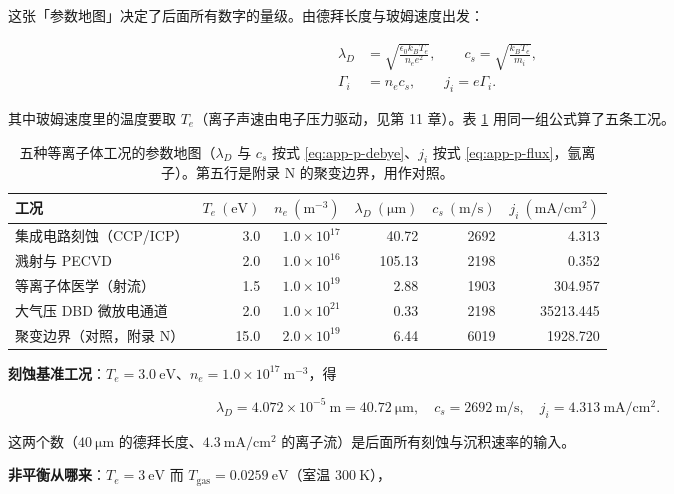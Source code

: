 这张「参数地图」决定了后面所有数字的量级。由德拜长度与玻姆速度出发：

\begin{align}
  \lambda_D &= \sqrt{\frac{\epsilon_0 k_B T_e}{n_e e^2}}, \qquad c_s = \sqrt{\frac{k_B T_e}{m_i}}, \label{eq:app-p-debye}\\
  \Gamma_i &= n_e c_s, \qquad j_i = e\Gamma_i. \label{eq:app-p-flux}
\end{align}

其中玻姆速度里的温度要取 $T_e$（离子声速由电子压力驱动，见第 11 章）。表 \ref{tab:app-p-regimes} 用同一组公式算了五条工况。

\begin{table}[htbp]
  \centering
  \small
  \caption{五种等离子体工况的参数地图（$\lambda_D$ 与 $c_s$ 按式 \eqref{eq:app-p-debye}、$j_i$ 按式 \eqref{eq:app-p-flux}，氩离子）。第五行是附录 N 的聚变边界，用作对照。}
  \label{tab:app-p-regimes}
  \begin{tabular}{@{}lrrrrr@{}}
    \toprule
    工况 & $T_e\ (\mathrm{eV})$ & $n_e\ (\mathrm{m}^{-3})$ & $\lambda_D\ (\mathrm{\mu m})$ & $c_s\ (\mathrm{m/s})$ & $j_i\ (\mathrm{mA/cm^2})$ \\
    \midrule
    集成电路刻蚀（CCP/ICP） & 3.0 & $1.0\times10^{17}$ & 40.72 & 2692 & 4.313 \\
    溅射与 PECVD & 2.0 & $1.0\times10^{16}$ & 105.13 & 2198 & 0.352 \\
    等离子体医学（射流） & 1.5 & $1.0\times10^{19}$ & 2.88 & 1903 & 304.957 \\
    大气压 DBD 微放电通道 & 2.0 & $1.0\times10^{21}$ & 0.33 & 2198 & 35213.445 \\
    聚变边界（对照，附录 N） & 15.0 & $2.0\times10^{19}$ & 6.44 & 6019 & 1928.720 \\
    \bottomrule
  \end{tabular}
\end{table}

\textbf{刻蚀基准工况}：$T_e=3.0\ \mathrm{eV}$、$n_e=1.0\times10^{17}\ \mathrm{m}^{-3}$，得

\begin{equation}
  \lambda_D = 4.072\times10^{-5}\ \mathrm{m} = 40.72\ \mathrm{\mu m}, \quad
  c_s = 2692\ \mathrm{m/s}, \quad
  j_i = 4.313\ \mathrm{mA/cm^2}.
  \label{eq:app-p-etchbase}
\end{equation}

这两个数（$40\ \mathrm{\mu m}$ 的德拜长度、$4.3\ \mathrm{mA/cm^2}$ 的离子流）是后面所有刻蚀与沉积速率的输入。

\textbf{非平衡从哪来}：$T_e=3\ \mathrm{eV}$ 而 $T_{\mathrm{gas}}=0.0259\ \mathrm{eV}$（室温 $300\ \mathrm{K}$），

